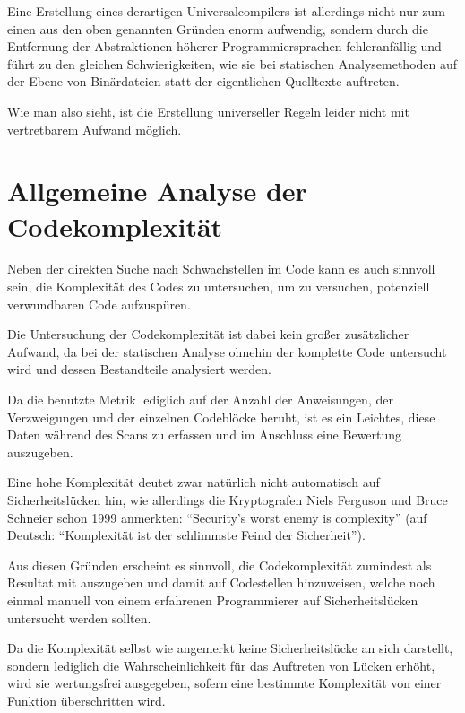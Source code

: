             Eine Erstellung eines derartigen Universalcompilers ist allerdings nicht nur zum einen aus den oben genannten Gründen enorm aufwendig,
            sondern durch die Entfernung der Abstraktionen höherer Programmiersprachen fehleranfällig und
            führt zu den gleichen Schwierigkeiten,
            wie sie bei statischen Analysemethoden auf der Ebene von Binärdateien statt der eigentlichen Quelltexte auftreten.

            Wie man also sieht,
            ist die Erstellung universeller Regeln leider nicht mit vertretbarem Aufwand möglich.

    \section{Allgemeine Analyse der Codekomplexität}
        Neben der direkten Suche nach Schwachstellen im Code kann es auch sinnvoll sein,
        die Komplexität des Codes zu untersuchen,
        um zu versuchen,
        potenziell verwundbaren Code aufzuspüren.

        Die Untersuchung der Codekomplexität ist dabei kein großer zusätzlicher Aufwand,
        da bei der statischen Analyse ohnehin der komplette Code untersucht wird und
        dessen Bestandteile analysiert werden.

        Da die benutzte Metrik lediglich auf der Anzahl der Anweisungen,
        der Verzweigungen und
        der einzelnen Codeblöcke beruht,
        ist es ein Leichtes,
        diese Daten während des Scans zu erfassen und
        im Anschluss eine Bewertung auszugeben.

        Eine hohe Komplexität deutet zwar natürlich nicht automatisch auf Sicherheitslücken hin,
        wie allerdings die Kryptografen Niels Ferguson und
        Bruce Schneier schon 1999 anmerkten:
        \foreignquote{english}{Security's worst enemy is complexity}
        (auf Deutsch:
        \enquote{Komplexität ist der schlimmste Feind der Sicherheit}).\cite{Ferguson1999}

        Aus diesen Gründen erscheint es sinnvoll,
        die Codekomplexität zumindest als Resultat mit auszugeben und
        damit auf Codestellen hinzuweisen,
        welche noch einmal manuell von einem erfahrenen Programmierer auf Sicherheitslücken untersucht werden sollten.

        Da die Komplexität selbst wie
        angemerkt keine Sicherheitslücke an sich darstellt,
        sondern lediglich die Wahrscheinlichkeit für das Auftreten von Lücken erhöht,
        wird sie wertungsfrei ausgegeben,
        sofern eine bestimmte Komplexität von einer Funktion überschritten wird.

